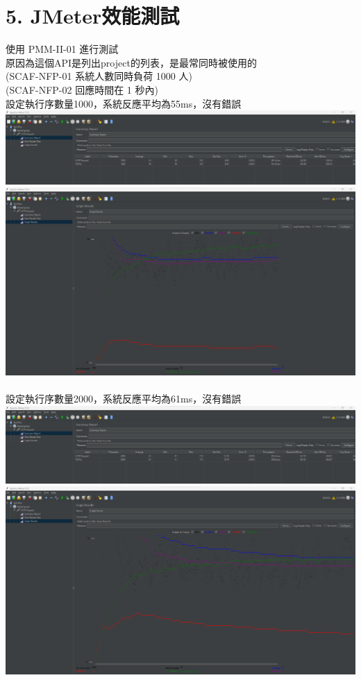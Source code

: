 \documentclass{report}
\begin{document}
\section*{5. JMeter效能測試}
\graphicspath{ {./images} }
使用 PMM-II-01 進行測試\\
原因為這個API是列出project的列表，是最常同時被使用的\\
(SCAF-NFP-01 系統人數同時負荷 1000 人)\\
(SCAF-NFP-02 回應時間在 1 秒內)\\
設定執行序數量1000，系統反應平均為55ms，沒有錯誤\\
\includegraphics[scale=0.35]{1000_1.png}
\includegraphics[scale=0.35]{1000_2.png}
\\
\newline
\\
設定執行序數量2000，系統反應平均為61ms，沒有錯誤 \\
\includegraphics[scale=0.35]{2000_1.png}
\includegraphics[scale=0.35]{2000_2.png}
\end{document}
